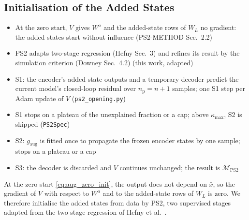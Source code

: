 \subsection{Initialisation of the Added States}\label{sec:aug_ps2}
\ifdraft
\begin{itemize}
\item At the zero start, $V$ gives $W^a$ and the added-state rows of $W_L$ no gradient: the added states start without influence (PS2-METHOD Sec.~2.2)
\item PS2 adapts two-stage regression (Hefny Sec.~3) and refines its result by the simulation criterion (Downey Sec.~4.2) (this work, adapted)
\item S1: the encoder's added-state outputs and a temporary decoder predict the current model's closed-loop residual over $n_{\mathrm p}=n+1$ samples; one S1 step per Adam update of $V$ (\texttt{ps2\_opening.py})
\item S1 stops on a plateau of the unexplained fraction or a cap; above $\kappa_{\max}$, S2 is skipped (\texttt{PS2Spec})
\item S2: $g_{\mathrm{aug}}$ is fitted once to propagate the frozen encoder states by one sample; stops on a plateau or a cap
\item S3: the decoder is discarded and $V$ continues unchanged; the result is $\mathcal M_{\mathrm{PS2}}$
\end{itemize}
\fi

At the zero start \eqref{eq:aug_zero_init}, the output does not depend on
$\bar x$, so the gradient of $V$ with respect to $W^a$ and to the added-state
rows of $W_L$ is zero.
We therefore initialise the added states from data by PS2, two supervised
stages adapted from the two-stage regression of Hefny et
al.~\cite[Sec.~3]{hefny2015supervised}.

